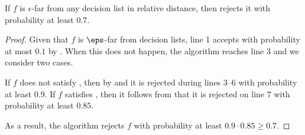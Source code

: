 \documentclass[11pt]{article}
\theoremstyle{definition}
\begin{document}
\begin{theorem} \label{thm:soundness}
    If $f$ is $\epsilon$-far from any decision list in relative distance, then  rejects it with probability at least $0.7$. 
\end{theorem}
\begin{proof}
Given that $f$ is $\eps$-far from decision lists, line 1 accepts
  with probability at most $0.1$ by .
When this does not happen, the algorithm reaches line {3}
and we consider two cases.
  
If $f$ does not satisfy ,
  then by  and  it is rejected during lines 3--6 with probability at least $0.9$.
If $f$ satisfies , then it follows from  that it is rejected on line 7 with probability at least $0.85.$

As a result, the algorithm rejects $f$ with probability
  at least $0.9 \cdot 0.85\ge 0.7.$
\end{proof}





















































 
\begin{flushleft}


\end{flushleft}

\appendix
\end{document}
